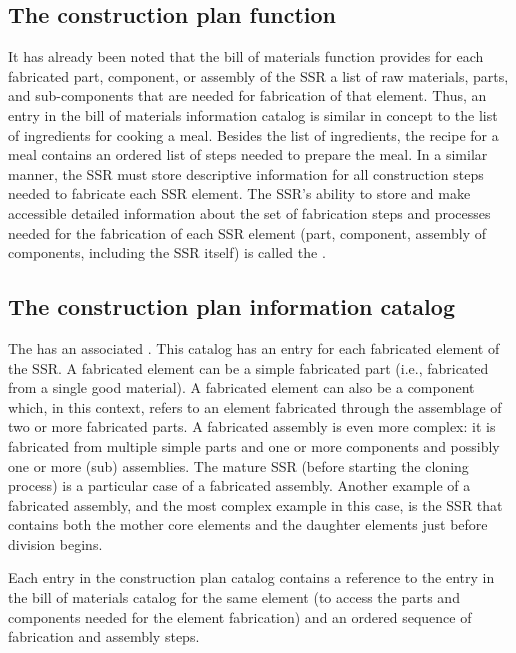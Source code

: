 \subsection[The construction plan function]{The construction plan
function}

It has already been noted that the bill of
materials function provides for each fabricated part, component, or
assembly of the SSR a list of raw materials, parts, and sub-components
that are needed for fabrication of that element. Thus, an entry in the
bill of materials information catalog is similar in concept to the
list of ingredients for cooking a meal. Besides the list of
ingredients, the recipe for a meal contains an ordered list of steps
needed to prepare the meal. In a similar manner, the SSR must store
descriptive information for all construction steps needed to fabricate
each SSR element. The SSR's ability to store and make
accessible detailed information about the set of fabrication steps and
processes needed for the fabrication of each SSR element (part,
component, assembly of components, including the SSR itself) is
called the .

\subsection[The construction plan information catalog]{The construction
plan information catalog}

The  has an associated . 
This catalog has an entry for each fabricated element of the
SSR. A fabricated element can be a simple fabricated part (i.e., fabricated
from a single good material). A fabricated element can also be a
component which, in this context, refers to an element fabricated
through the assemblage of two or more fabricated parts. A fabricated
assembly is even more complex: it is fabricated from multiple simple
parts and one or more components and possibly one or more (sub)
assemblies. The mature SSR (before starting the cloning process) is a
particular case of a fabricated assembly. 
Another example of a fabricated assembly, and the most complex example in this case, is the SSR that contains both the mother core elements and the daughter elements just before division begins.


Each entry in the construction plan catalog contains a reference to the entry in the bill of materials catalog for the same element (to access the parts and components needed for the element fabrication) and an ordered sequence of fabrication and assembly steps.

